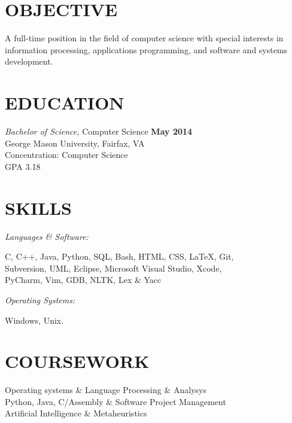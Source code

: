 \documentclass[line, margin]{res}
\begin{document}
\address{8601 Gateshead Road, Alexandria, VA 22309}
\address{Cell: 571.337.9654, Email: cameron.pelkey@gmail.com}


\begin{resume}

\section{OBJECTIVE}  A full-time position in the field of computer science with special interests in information processing, applications programming, and software and systems development.


\section{EDUCATION} {\sl Bachelor of Science,} Computer Science \hfill \textbf{May 2014}\\
		George Mason University, Fairfax, VA\\
		Concentration: Computer Science \\
		GPA 3.18


\section{SKILLS}
	{\sl Languages \& Software:} \begin{minipage}[t]{\textwidth}
	C, C++, Java, Python, SQL, Bash, HTML, CSS, \LaTeX, Git,\\
	Subversion, UML, Eclipse, Microsoft Visual Studio, Xcode, \\
	PyCharm, Vim, GDB, NLTK, Lex \& Yacc
	\end{minipage}
	{\sl Operating Systems:} \begin{minipage}[t]{\textwidth}
	Windows, Unix.
	\end{minipage}

\section{COURSEWORK}
    \begin{ncolumn}{2}
        Operating systems & Language Processing \& Analysys \\
        Python, Java, C/Assembly & Software Project Management \\
        Artificial Intelligence \& Metaheuristics
    \end{ncolumn}


\end{resume}
\end{document}
